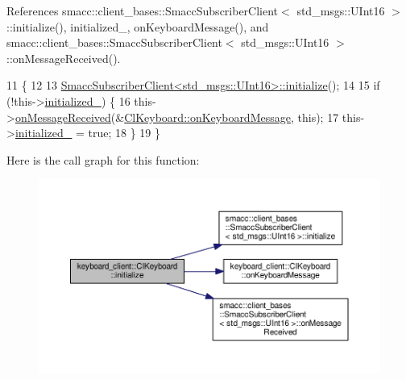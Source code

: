References smacc\+::client\+\_\+bases\+::\+Smacc\+Subscriber\+Client$<$ std\+\_\+msgs\+::\+U\+Int16 $>$\+::initialize(), initialized\+\_\+, on\+Keyboard\+Message(), and smacc\+::client\+\_\+bases\+::\+Smacc\+Subscriber\+Client$<$ std\+\_\+msgs\+::\+U\+Int16 $>$\+::on\+Message\+Received().


\begin{DoxyCode}
11                             \{
12 
13   \hyperlink{classsmacc_1_1client__bases_1_1SmaccSubscriberClient_af188f0f5e89de26a07e1f964cdd23a70}{SmaccSubscriberClient<std\_msgs::UInt16>::initialize}();
14 
15   \textcolor{keywordflow}{if} (!this->\hyperlink{classkeyboard__client_1_1ClKeyboard_aff74d4f212f4846a1f7cc6c0e4d5f728}{initialized\_}) \{
16     this->\hyperlink{classsmacc_1_1client__bases_1_1SmaccSubscriberClient_a4f02251e3a161fb6d802b154b1081f18}{onMessageReceived}(&\hyperlink{classkeyboard__client_1_1ClKeyboard_adbfb9c2b98f784b12cf7740b4e861d8e}{ClKeyboard::onKeyboardMessage}, \textcolor{keyword}{
      this});
17     this->\hyperlink{classkeyboard__client_1_1ClKeyboard_aff74d4f212f4846a1f7cc6c0e4d5f728}{initialized\_} = \textcolor{keyword}{true};
18   \}
19 \}
\end{DoxyCode}


Here is the call graph for this function\+:\nopagebreak
\begin{figure}[H]
\begin{center}
\leavevmode
\includegraphics[width=350pt]{classkeyboard__client_1_1ClKeyboard_a7ac4502969c62b0c836b531cec05f8ed_cgraph}
\end{center}
\end{figure}


